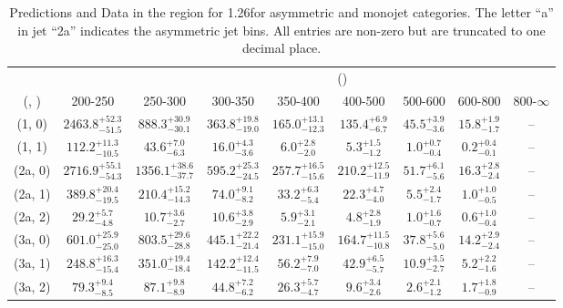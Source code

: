 \begin{table}[h!]
\tiny
\centering
\caption{Predictions and Data in the \mj region for 1.26\ifb for asymmetric and monojet categories. The letter ``a'' in jet \eg ``2a''  indicates the asymmetric jet bins. All entries are non-zero but are truncated to one decimal place.\label{tab:prednodata_comb_mu_asym}}
\begin{tabular}
{ccccccccc}
	\hline\hline
&	& \multicolumn{8}{c}{\scalht (\gev)} \\ 
	 (\njet,  \nb) & 200-250 & 250-300 & 300-350 & 350-400 & 400-500 & 500-600 & 600-800 & 800-$\infty$ \\ [0.8ex] 
\hline
	(1, 0) & $2463.8^{+ 52.3 }_{- 51.5 }$ & $888.3^{+ 30.9 }_{- 30.1 }$ & $363.8^{+ 19.8 }_{- 19.0 }$ & $165.0^{+ 13.1 }_{- 12.3 }$ & $135.4^{+ 6.9 }_{- 6.7 }$ & $45.5^{+ 3.9 }_{- 3.6 }$ & $15.8^{+ 1.9 }_{- 1.7 }$ & -- \\[0.5ex] 
	(1, 1) & $112.2^{+ 11.3 }_{- 10.5 }$ & $43.6^{+ 7.0 }_{- 6.3 }$ & $16.0^{+ 4.3 }_{- 3.6 }$ & $6.0^{+ 2.8 }_{- 2.0 }$ & $5.3^{+ 1.5 }_{- 1.2 }$ & $1.0^{+ 0.7 }_{- 0.4 }$ & $0.2^{+ 0.4 }_{- 0.1 }$ & -- \\[0.5ex] 
	(2a, 0) & $2716.9^{+ 55.1 }_{- 54.3 }$ & $1356.1^{+ 38.6 }_{- 37.7 }$ & $595.2^{+ 25.3 }_{- 24.5 }$ & $257.7^{+ 16.5 }_{- 15.6 }$ & $210.2^{+ 12.5 }_{- 11.9 }$ & $51.7^{+ 6.1 }_{- 5.6 }$ & $16.3^{+ 2.8 }_{- 2.4 }$ & -- \\[0.5ex] 
	(2a, 1) & $389.8^{+ 20.4 }_{- 19.5 }$ & $210.4^{+ 15.2 }_{- 14.3 }$ & $74.0^{+ 9.1 }_{- 8.2 }$ & $33.2^{+ 6.3 }_{- 5.4 }$ & $22.3^{+ 4.7 }_{- 4.0 }$ & $5.5^{+ 2.4 }_{- 1.7 }$ & $1.0^{+ 1.0 }_{- 0.5 }$ & -- \\[0.5ex] 
	(2a, 2) & $29.2^{+ 5.7 }_{- 4.8 }$ & $10.7^{+ 3.6 }_{- 2.7 }$ & $10.6^{+ 3.8 }_{- 2.9 }$ & $5.9^{+ 3.1 }_{- 2.1 }$ & $4.8^{+ 2.8 }_{- 1.9 }$ & $1.0^{+ 1.6 }_{- 0.7 }$ & $0.6^{+ 1.0 }_{- 0.4 }$ & -- \\[0.5ex] 
	(3a, 0) & $601.0^{+ 25.9 }_{- 25.0 }$ & $803.5^{+ 29.6 }_{- 28.8 }$ & $445.1^{+ 22.2 }_{- 21.4 }$ & $231.1^{+ 15.9 }_{- 15.0 }$ & $164.7^{+ 11.5 }_{- 10.8 }$ & $37.8^{+ 5.6 }_{- 5.0 }$ & $14.2^{+ 2.9 }_{- 2.4 }$ & -- \\[0.5ex] 
	(3a, 1) & $248.8^{+ 16.3 }_{- 15.4 }$ & $351.0^{+ 19.4 }_{- 18.4 }$ & $142.2^{+ 12.4 }_{- 11.5 }$ & $56.2^{+ 7.9 }_{- 7.0 }$ & $42.9^{+ 6.5 }_{- 5.7 }$ & $10.9^{+ 3.5 }_{- 2.7 }$ & $5.2^{+ 2.2 }_{- 1.6 }$ & -- \\[0.5ex] 
	(3a, 2) & $79.3^{+ 9.4 }_{- 8.5 }$ & $87.1^{+ 9.8 }_{- 8.9 }$ & $44.8^{+ 7.2 }_{- 6.2 }$ & $26.3^{+ 5.7 }_{- 4.7 }$ & $9.6^{+ 3.4 }_{- 2.6 }$ & $2.6^{+ 2.1 }_{- 1.2 }$ & $1.7^{+ 1.8 }_{- 0.9 }$ & -- \\[0.5ex] 

\end{tabular}
\end{table}
